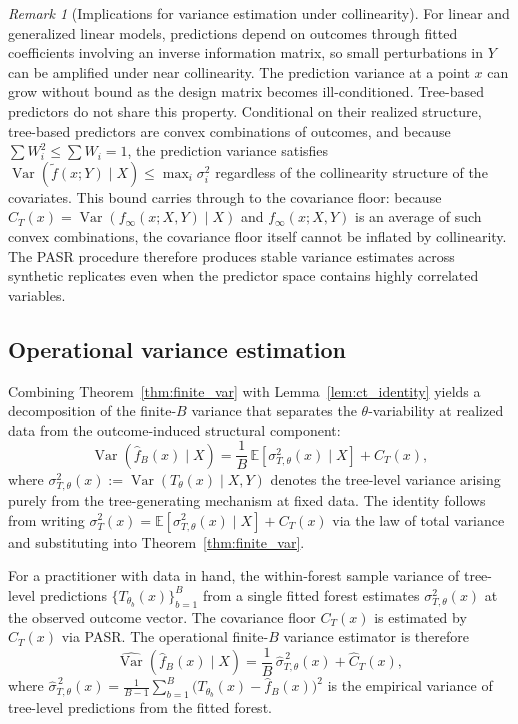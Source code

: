 \documentclass[11pt]{article}
\theoremstyle{plain}
\theoremstyle{definition}
\theoremstyle{remark}
\newtheorem{remark}{Remark}
\DeclareMathOperator{\Var}{Var}
\begin{document}
\begin{remark}[Implications for variance estimation under collinearity]
	\label{rem:glm_contrast}
	For linear and generalized linear models, predictions depend on outcomes through fitted coefficients involving an inverse information matrix, so small perturbations in $Y$ can be amplified under near collinearity. The prediction variance at a point $x$ can grow without bound as the design matrix becomes ill-conditioned. Tree-based predictors do not share this property. Conditional on their realized structure, tree-based predictors are convex combinations of outcomes, and because $\sum W_i^2 \leq \sum W_i = 1$, the prediction variance satisfies $\Var(\tilde f(x;Y) \mid X) \leq \max_i \sigma_i^2$ regardless of the collinearity structure of the covariates. This bound carries through to the covariance floor: because $C_T(x) = \Var(f_\infty(x;X,Y) \mid X)$ and $f_\infty(x;X,Y)$ is an average of such convex combinations, the covariance floor itself cannot be inflated by collinearity. The PASR procedure therefore produces stable variance estimates across synthetic replicates even when the predictor space contains highly correlated variables.
\end{remark}

\subsection{Operational variance estimation}
\label{subsec:operational}

Combining Theorem~\ref{thm:finite_var} with Lemma~\ref{lem:ct_identity} yields a decomposition of the finite-$B$ variance that separates the $\theta$-variability at realized data from the outcome-induced structural component:
\[
\Var\!\left(\hat f_B(x)\mid X\right)
=
\frac{1}{B}\,\mathbb E\!\left[\sigma_{T,\theta}^2(x)\mid X\right]
+
C_T(x),
\]
where $\sigma_{T,\theta}^2(x):=\Var(T_\theta(x)\mid X,Y)$ denotes the tree-level variance arising purely from the tree-generating mechanism at fixed data. The identity follows from writing $\sigma_T^2(x)=\mathbb E[\sigma_{T,\theta}^2(x)\mid X]+C_T(x)$ via the law of total variance and substituting into Theorem~\ref{thm:finite_var}.

For a practitioner with data in hand, the within-forest sample variance of tree-level predictions $\{T_{\theta_b}(x)\}_{b=1}^B$ from a single fitted forest estimates $\sigma_{T,\theta}^2(x)$ at the observed outcome vector. The covariance floor $C_T(x)$ is estimated by $\widehat C_T(x)$ via PASR. The operational finite-$B$ variance estimator is therefore
\begin{equation}
	\label{eq:var_hat_operational}
	\widehat{\Var}\!\left(\hat f_B(x)\mid X\right)
	=
	\frac{1}{B}\,\widehat\sigma_{T,\theta}^{\,2}(x)
	+
	\widehat C_T(x),
\end{equation}
where $\widehat\sigma_{T,\theta}^{\,2}(x)=\frac{1}{B-1}\sum_{b=1}^B\bigl(T_{\theta_b}(x)-\hat f_B(x)\bigr)^2$ is the empirical variance of tree-level predictions from the fitted forest.
\end{document}
